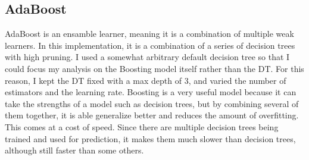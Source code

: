 \documentclass[
	letterpaper, %
]{mlreport}
\begin{document}
\subsection{AdaBoost}
AdaBoost is an ensamble learner, meaning it is a combination of multiple weak learners. In this implementation, it is a combination of a series of decision trees with high pruning. I used a somewhat arbitrary default decision tree so that I could focus my analysis on the Boosting model itself rather than the DT. For this reason, I kept the DT fixed with a max depth of 3, and varied the number of estimators and the learning rate. Boosting is a very useful model because it can take the strengths of a model such as decision trees, but by combining several of them together, it is able generalize better and reduces the amount of overfitting. This comes at a cost of speed. Since there are multiple decision trees being trained and used for prediction, it makes them much slower than decision trees, although still faster than some others.
\end{document}
